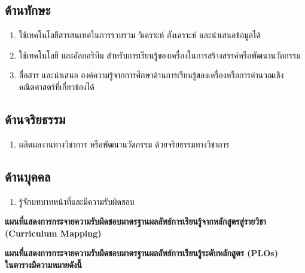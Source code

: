 \subsection{ด้านทักษะ}
\begin{enumerate}
	\item ใช้เทคโนโลยีสารสนเทศในการรวบรวม วิเคราะห์ สังเคราะห์ และนำเสนอข้อมูลได้
	\item ใช้เทคโนโลยี และอัลกอริทึม สำหรับการเรียนรู้ของเครื่องในการสร้างสรรค์หรือพัฒนานวัตกรรม
	\item สื่อสาร และนำเสนอ องค์ความรู้จากการศึกษาด้านการเรียนรู้ของเครื่องหรือการคำนวณเชิงคณิตศาสตร์ที่เกี่ยวข้องได้
\end{enumerate}
\subsection{ด้านจริยธรรม}
\begin{enumerate}
	\item ผลิตผลงานทางวิชาการ หรือพัฒนานวัตกรรม ด้วยจริยธรรมทางวิชาการ
\end{enumerate}
\subsection{ด้านบุคคล}
\begin{enumerate}
	\item รู้จักบทบาทหน้าที่และมีความรับผิดชอบ
\end{enumerate}

\newpage
\begin{landscape}
\begin{center}

\textbf{\large แผนที่แสดงการกระจายความรับผิดชอบมาตรฐานผลลัพธ์การเรียนรู้จากหลักสูตรสู่รายวิชา (Curriculum Mapping)}
\par\bigskip
	
\end{center}
\end{landscape}


\newpage
\begin{center}
\textbf{\large แผนที่แสดงการกระจายความรับผิดชอบมาตรฐานผลลัพธ์การเรียนรู้ระดับหลักสูตร (PLOs) \\ในตารางมีความหมายดังนี้}
\end{center}

